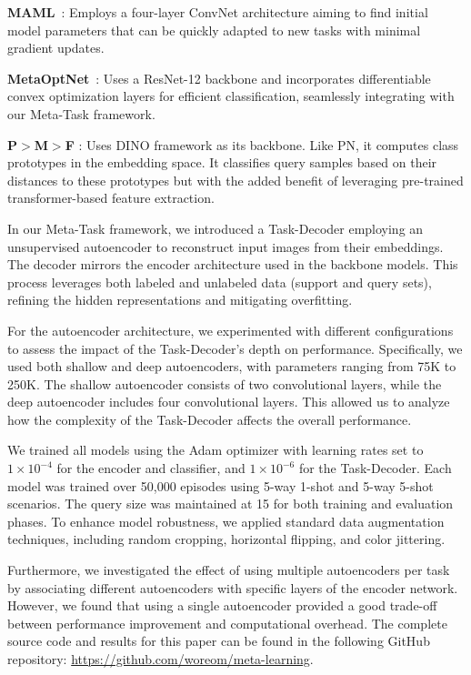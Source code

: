 \noindent
\textbf{MAML}~\cite{maml}: Employs a four-layer ConvNet architecture aiming to find initial model parameters that can be quickly adapted to new tasks with minimal gradient updates.

\noindent
\textbf{MetaOptNet}~\cite{lee2019metaoptnet}: Uses a ResNet-12 backbone and incorporates differentiable convex optimization layers for efficient classification, seamlessly integrating with our {Meta-Task} framework.

\noindent
\textbf{P$>$M$>$F} \cite{pmf}: Uses DINO\cite{dino} framework as its backbone. Like PN, it computes class prototypes in the embedding space. It classifies query samples based on their distances to these prototypes but with the added benefit of leveraging pre-trained transformer-based feature extraction.

In our {Meta-Task} framework, we introduced a Task-Decoder employing an unsupervised autoencoder to reconstruct input images from their embeddings. The decoder mirrors the encoder architecture used in the backbone models. This process leverages both labeled and unlabeled data (support and query sets), refining the hidden representations and mitigating overfitting.

For the autoencoder architecture, we experimented with different configurations to assess the impact of the Task-Decoder's depth on performance. Specifically, we used both shallow and deep autoencoders, with parameters ranging from 75K to 250K. The shallow autoencoder consists of two convolutional layers, while the deep autoencoder includes four convolutional layers. This allowed us to analyze how the complexity of the Task-Decoder affects the overall performance.

We trained all models using the Adam optimizer with learning rates set to $1 \times 10^{-4}$ for the encoder and classifier, and $1 \times 10^{-6}$ for the Task-Decoder. Each model was trained over 50,000 episodes using 5-way 1-shot and 5-way 5-shot scenarios. The query size was maintained at 15 for both training and evaluation phases. To enhance model robustness, we applied standard data augmentation techniques, including random cropping, horizontal flipping, and color jittering.

Furthermore, we investigated the effect of using multiple autoencoders per task by associating different autoencoders with specific layers of the encoder network. However, we found that using a single autoencoder provided a good trade-off between performance improvement and computational overhead. The complete source code and results for this paper can be found in the following GitHub repository: \href{https://github.com/woreom/meta-learning}{https://github.com/woreom/meta-learning}.
  

